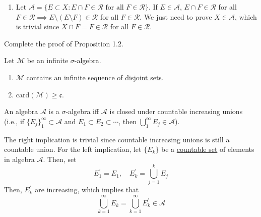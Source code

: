 \begin{solution}
\begin{enumerate}
			\item Let $\mathcal{A} = \{E \subset X \colon E \cap F \in \mathcal{R} \text{ for all } F \in \mathcal{R} \}$. If $E \in \mathcal{A}$, $E \cap F \in \mathcal{R}$ for all $F \in \mathcal{R} \implies E \setminus (E \setminus F) \in \mathcal{R}$ for all $F \in \mathcal{R}$. We just need to prove $X \in \mathcal{A}$, which is trivial since $X \cap F = F \in \mathcal{R}$ for all $F \in \mathcal{R}$. 
		\end{enumerate}
	\end{solution}

	\begin{exercise}[Folland 1.2]
		Complete the proof of Proposition 1.2.
	\end{exercise}
	\begin{solution}

	\end{solution}

	\begin{exercise}[Folland 1.3]
		Let $\mathcal{M}$ be an infinite $\sigma$-algebra.
		\begin{enumerate}[label=\textbf{\alph*.}]
			\item $\mathcal{M}$ contains an infinite sequence of \hyperref[st-def:disjoint-sets]{disjoint sets}.
			\item $\text{card}(\mathcal{M}) \ge \mathfrak{c}$.
		\end{enumerate}
	\end{exercise}
	\begin{solution}
	\end{solution}

	\begin{exercise}[Folland 1.4]
		An algebra $\mathcal{A}$ is a $\sigma$-algebra iff $\mathcal{A}$ is closed under countable increasing unions (i.e., if $\{E_j\}_1^\infty \subset \mathcal{A}$ and $E_1 \subset E_2 \subset \cdots$, then $\bigcup_1^\infty E_j \in \mathcal{A}$).
	\end{exercise}
	\begin{solution}
		The right implication is trivial since countable increasing unions is still a countable union. For the left implication, let $\{E_k\}$ be a \hyperref[st-def:countable]{countable set} of elements in algebra $\mathcal{A}$. Then, set 
		\begin{equation}
			E_1^\prime = E_1, \quad E_k^\prime = \bigcup_{j=1}^k E_j
		\end{equation}
		Then, $E_k^\prime$ are increasing, which implies that 
		\begin{equation}
			\bigcup_{k=1}^\infty E_k = \bigcup_{k=1}^\infty E_k^\prime \in \mathcal{A}
		\end{equation}

	\end{solution}

